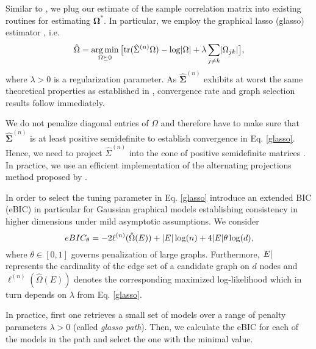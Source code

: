 Similar to \citet{Fan17}, we plug our estimate of the sample correlation matrix into existing routines for estimating $\boldsymbol{\Omega}^*$. In particular, we employ the graphical lasso (glasso) estimator \citep{Friedman08}, i.e.
\begin{equation}\label{glasso}
    \hat{\Omega} = \argmin_{\Omega \succeq 0} \big[\text{tr}(\hat{\Sigma}^{(n)}\Omega) - \log\Abs{\Omega} + \lambda \sum_{j\neq k}\Abs{\Omega_{jk}}\big], 
\end{equation}
where $\lambda > 0$ is a regularization parameter. As $\hat{\boldsymbol\Sigma}^{(n)}$ exhibits at worst the same theoretical properties as established in %
\citet{Liu09}, convergence rate and graph selection results follow immediately. 

We do not penalize diagonal entries of $\Omega$ and therefore have to make sure that $\hat{\boldsymbol\Sigma}^{(n)}$ is at least positive semidefinite to establish convergence in Eq. \eqref{glasso}. Hence, we need to project $\hat{\Sigma}^{(n)}$ into the cone of positive semidefinite matrices \citep[compare also][]{Liu12, Fan17}. In practice, we use an efficient implementation of the alternating projections method proposed by \citet{Higham88}.      

In order to select the tuning parameter in Eq. \eqref{glasso}
\citet{Foygel10} introduce an extended BIC (eBIC) in particular for Gaussian graphical models establishing consistency in higher dimensions under mild asymptotic assumptions. We consider
\begin{equation}\label{EBIC}
    eBIC_\theta = -2 \ell^{(n)}(\hat{\Omega}(E)) + \Abs{E} \log(n) + 4 \Abs{E}\theta \log(d),
\end{equation}
where $\theta \in [0,1]$ governs penalization of large graphs. Furthermore, $\abs{E}$ represents the cardinality of the edge set of a candidate graph on $d$ nodes and $\ell^{(n)}(\hat{\Omega}(E))$ denotes the corresponding maximized log-likelihood \citep[see][for more details]{Foygel10} which in turn depends on $\lambda$ from Eq. \eqref{glasso}. 

In practice, first one retrieves a small set of models over a range of penalty parameters $\lambda > 0$ (called \textit{glasso path}). Then, we calculate the eBIC for each of the models in the path and select the one with the minimal value. 

